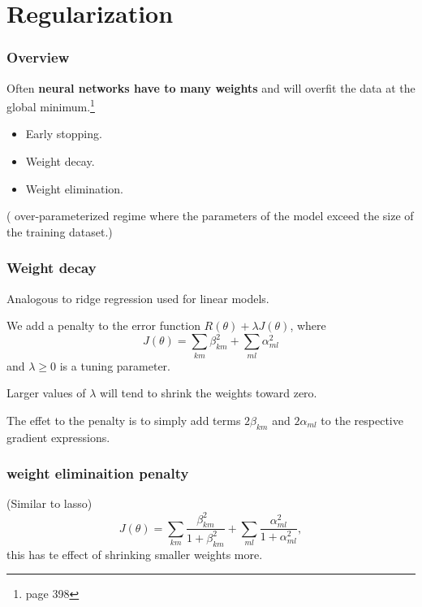 \section{Regularization}

\begin{frame}
    \frametitle{Overview}
    Often \textbf{neural networks have to many weights} and will overfit the data at 
    the global minimum.\footnote{\cite{HastieStatisticalLearing} page 398}
    
    \begin{itemize}
        \item Early stopping.
        \item Weight decay. 
        \item Weight elimination.
    \end{itemize}
    \cite{AUniversalLawofRobustness} 
    ( over-parameterized regime where the parameters of
     the model exceed the size of the training dataset.)
\end{frame}

\begin{frame}
    \frametitle{Weight decay}
    Analogous to ridge regression used for linear models. 

    We add a penalty to the error function 
    $R(\theta) + \lambda J(\theta)$, 
    where 
    \begin{equation}
        J(\theta)
        =
        \sum_{k m} \beta_{k m}^2
        +
        \sum_{m l} \alpha_{m l}^2
    \end{equation}
    and $\lambda \geq 0$ is a tuning parameter.

    Larger values of $\lambda$ will tend to 
    shrink the weights toward zero.

    The effet to the penalty is to simply add
    terms $2 \beta_{k m}$ and $2 \alpha_{m l}$
    to the respective gradient expressions. 
\end{frame}

\begin{frame}
        \frametitle{weight eliminaition penalty}
(Similar to lasso)
    \begin{equation}
        J(\theta)
        =
        \sum_{k m}
            \frac{\beta_{k m}^2}{1 + \beta^2_{km}}
        +
        \sum_{m l}
            \frac{\alpha^2_{m l}}{1 + \alpha_{ml}^2},
    \end{equation}
    this has te effect of shrinking smaller weights more. 
\end{frame}

